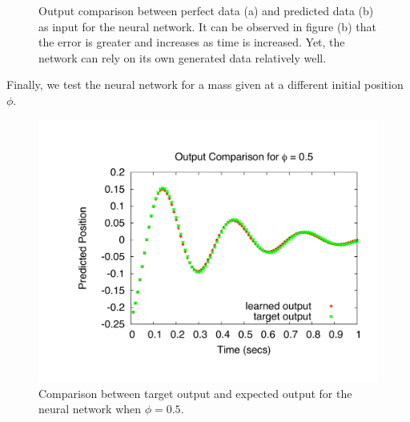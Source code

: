 \documentclass[11pt]{article}
\begin{document}
\begin{figure}[]
	\centering
		\caption{Output comparison between perfect data (a) and predicted data (b) as input for the neural network. It can be observed in figure (b) that the error is greater and increases as time is increased. Yet, the network can rely on its own generated data relatively well.}
	\label{fig:bpgt-3.0_damping_test_output_comp}	
\end{figure}

Finally, we test the neural network for a mass given at a different initial position $\phi$.


\begin{figure}[htbp]
	\centering
		\includegraphics[width=0.85\columnwidth]{../bpgt-3.0/damping_test/output_phi.pdf}
	\caption{Comparison between target output and expected output for the neural network when $\phi=0.5$.}
	\label{fig:bpgt-3.0_damping_test_output_phi}
\end{figure}
\end{document}
